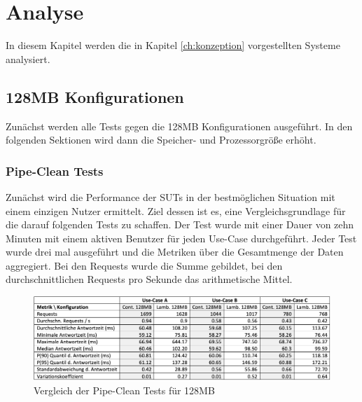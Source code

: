 \chapter{Analyse}
In diesem Kapitel werden die in Kapitel \ref{ch:konzeption} vorgestellten Systeme analysiert.

\section{128MB Konfigurationen}
Zunächst werden alle Tests gegen die 128MB Konfigurationen ausgeführt. In den folgenden Sektionen wird dann die Speicher- und Prozessorgröße erhöht. 

\subsection{Pipe-Clean Tests}
Zunächst wird die Performance der SUTs in der bestmöglichen Situation mit einem einzigen Nutzer ermittelt. Ziel dessen ist es, eine Vergleichsgrundlage für die darauf folgenden Tests zu schaffen. Der Test wurde mit einer Dauer von zehn Minuten mit einem aktiven Benutzer für jeden Use-Case durchgeführt. Jeder Test wurde drei mal ausgeführt und die Metriken über die Gesamtmenge der Daten aggregiert. Bei den Requests wurde die Summe gebildet, bei den durchschnittlichen Requests pro Sekunde das arithmetische Mittel.

\begin{figure}[H]
    \includegraphics[width=\textwidth]{img/pipe128-comparison.png}
    \caption[Vergleich der Pipe-Clean Tests für 128MB]{Vergleich der Pipe-Clean Tests für 128MB}
    \label{fig:pipe128-comparison}
\end{figure}


